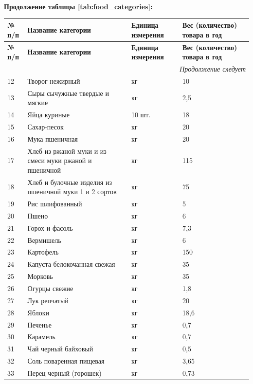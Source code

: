 	\newpage %
	
	\noindent
	\textbf{Продолжение таблицы \ref{tab:food_categories}:} \\
	
	\begin{longtable}{|p{1.8cm}|p{6cm}|p{4cm}|p{4cm}|} %
	\toprule
	\textbf{№ п/п} & \textbf{Название категории} & \textbf{Единица измерения} & \textbf{Вес (количество) товара в год} \\
	\midrule
	\endfirsthead
	
	\toprule
	\textbf{№ п/п} & \textbf{Название категории} & \textbf{Единица измерения} & \textbf{Вес (количество) товара в год} \\
	\midrule
	\endhead
	
	\hline
	\multicolumn{4}{|r|}{\small \slshape Продолжение следует} \\ 
	\hline
	\endfoot
	
	\endlastfoot
	
	\footnotesize %
	12  & Творог нежирный & кг & 10 \\
	13  & Сыры сычужные твердые и мягкие & кг & 2,5 \\
	14  & Яйца куриные & 10 шт. & 18 \\
	15  & Сахар-песок & кг & 20 \\
	16  & Мука пшеничная & кг & 20 \\
	17  & Хлеб из ржаной муки и из смеси муки ржаной и пшеничной & кг & 115 \\
	18  & Хлеб и булочные изделия из пшеничной муки 1 и 2 сортов & кг & 75 \\
	19  & Рис шлифованный & кг & 5 \\
	20  & Пшено & кг & 6 \\
	21  & Горох и фасоль & кг & 7,3 \\
	22  & Вермишель & кг & 6 \\
	23  & Картофель & кг & 150 \\
	24  & Капуста белокочанная свежая & кг & 35 \\
	25  & Морковь & кг & 35 \\
	26  & Огурцы свежие & кг & 1,8 \\
	27  & Лук репчатый & кг & 20 \\
	28  & Яблоки & кг & 18,6 \\
	29  & Печенье & кг & 0,7 \\
	30  & Карамель & кг & 0,7 \\
	31  & Чай черный байховый & кг & 0,5 \\
	32  & Соль поваренная пищевая & кг & 3,65 \\
	33  & Перец черный (горошек) & кг & 0,73 \\
\end{longtable}

